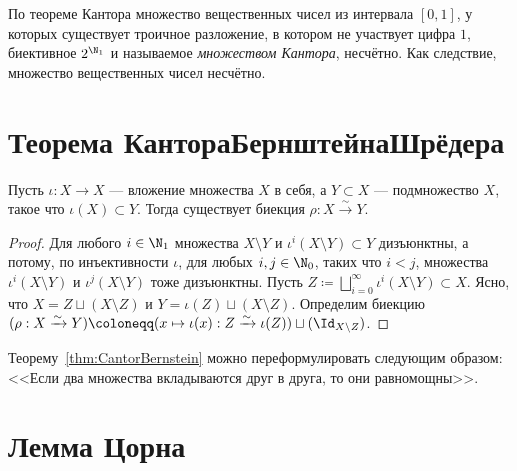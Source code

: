 \documentclass[
	extrafontsizes,
	11pt,
	hyphens,
]{memoir}
\begin{document}
\begin{observation}
По теореме Кантора множество вещественных чисел из интервала \([0,1]\), у которых существует троичное разложение, в котором не участвует цифра \(1\), биективное \(2^{\N_1}\) и называемое \emph{множеством Кантора}, несчётно. Как следствие, множество вещественных чисел несчётно.
\end{observation}


\section{Теорема Кантора\namedash{}Бернштейна\namedash{}Шрёдера}

\begin{theorem}
Пусть \(\iota : X \to X\) --- вложение множества \(X\) в себя, а \(Y \subset X\) --- подмножество \(X\), такое что \(\iota(X) \subset Y\).
\label{thm:CantorBernstein}
Тогда существует биекция \(\rho : X \xrightarrow{\sim} Y\).
\end{theorem}

\begin{proof}
Для любого \(i \in \N_1\) множества \(X \setminus Y\) и \(\iota^i(X \setminus Y) \subset Y\) дизъюнктны, а потому, по инъективности \(\iota\), для любых \(i,j \in \N_0\), таких что \(i < j\), множества \(\iota^i(X \setminus Y)\) и \(\iota^j(X \setminus Y)\) тоже дизъюнктны.
Пусть \(Z \coloneqq \bigsqcup_{i = 0}^{\infty} \iota^i(X \setminus Y) \subset X\).
Ясно, что \(X = Z \sqcup (X \setminus Z)\) и \(Y = \iota(Z) \sqcup (X \setminus Z)\).
Определим биекцию \((\rho : X \xrightarrow{\sim} Y) \coloneqq (x \mapsto \iota(x) : Z \xrightarrow{\sim} \iota(Z)) \sqcup (\Id_{X \setminus Z})\).
\end{proof}

\begin{remark}
Теорему~\ref{thm:CantorBernstein} можно переформулировать следующим образом: <<Если два множества вкладываются друг в друга, то они равномощны>>.
\end{remark}


\section{Лемма Цорна}

\end{document}
